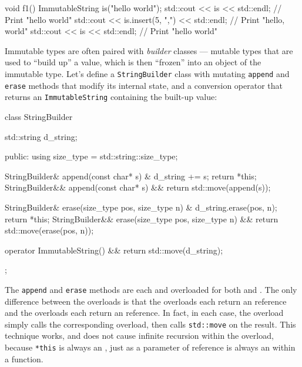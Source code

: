 \begin{emcppslisting}[emcppsbatch=e6]
void f1()
{
    ImmutableString is("hello world");
    std::cout << is << std::endl;                 // Print "hello world"
    std::cout << is.insert(5, ",") << std::endl;  // Print "hello, world"
    std::cout << is << std::endl;                 // Print "hello world"
}
\end{emcppslisting}
    

\noindent Immutable types are often paired with \emph{builder} classes --- mutable
types that are used to ``build up'' a value, which is then ``frozen''
into an object of the immutable type. Let's define a
\lstinline!StringBuilder! class with mutating \lstinline!append! and
\lstinline!erase! methods that modify its internal state, and a conversion
operator that returns an \lstinline!ImmutableString! containing the
built-up value:

\begin{emcppslisting}[emcppsbatch=e6]
class StringBuilder
{
    std::string d_string;

public:
    using size_type = std::string::size_type;

    StringBuilder&  append(const char* s) &  { d_string += s; return *this; }
    StringBuilder&& append(const char* s) && { return std::move(append(s)); }

    StringBuilder&  erase(size_type pos, size_type n) &
    {
        d_string.erase(pos, n);
        return *this;
    }
    StringBuilder&& erase(size_type pos, size_type n) &&
    {
        return std::move(erase(pos, n));
    }

    operator ImmutableString() && { return std::move(d_string); }
};
\end{emcppslisting}
    

\noindent The \lstinline!append! and \lstinline!erase! methods are each
 and overloaded for both  and
. The only difference between the overloads is that the
 overloads each return an  reference and the
 overloads each return an  reference. In fact,
in each case, the  overload simply calls the corresponding
 overload, then calls \lstinline!std::move! on the result.
This technique works, and does not cause infinite recursion within the
 overload, because \lstinline!*this! is always an
, just as a parameter of  reference is always
an  within a function.

